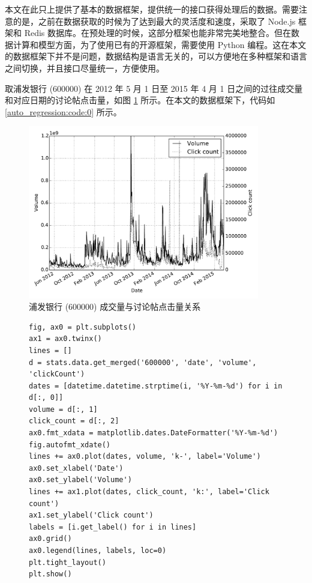 本文在此只上提供了基本的数据框架，提供统一的接口获得处理后的数据。需要注意的是，之前在数据获取的时候为了达到最大的灵活度和速度，采取了 Node.js 框架和 Redis 数据库。在预处理的时候，这部分框架也能非常完美地整合。但在数据计算和模型方面，为了使用已有的开源框架，需要使用 Python 编程。这在本文的数据框架下并不是问题，数据结构是语言无关的，可以方便地在多种框架和语言之间切换，并且接口尽量统一，方便使用。

取浦发银行 (600000) 在 2012 年 5 月 1 日至 2015 年 4 月 1 日之间的过往成交量和对应日期的讨论帖点击量，如图 \ref{auto_regression:0} 所示。在本文的数据框架下，代码如 \ref{auto_regression:code:0} 所示。

\begin{figure}
  \centering
  \includegraphics[width=0.9\textwidth]{plots/auto_regression_0.pdf}
  \caption{浦发银行 (600000) 成交量与讨论帖点击量关系}
  \label{auto_regression:0}
\end{figure}

\begin{figure}
  \begin{minipage}{\textwidth}
    \begin{lstlisting}[caption=数据框架示例, label=auto_regression:code:0]
fig, ax0 = plt.subplots()
ax1 = ax0.twinx()
lines = []
d = stats.data.get_merged('600000', 'date', 'volume', 'clickCount')
dates = [datetime.datetime.strptime(i, '%Y-%m-%d') for i in d[:, 0]]
volume = d[:, 1]
click_count = d[:, 2]
ax0.fmt_xdata = matplotlib.dates.DateFormatter('%Y-%m-%d')
fig.autofmt_xdate()
lines += ax0.plot(dates, volume, 'k-', label='Volume')
ax0.set_xlabel('Date')
ax0.set_ylabel('Volume')
lines += ax1.plot(dates, click_count, 'k:', label='Click count')
ax1.set_ylabel('Click count')
labels = [i.get_label() for i in lines]
ax0.grid()
ax0.legend(lines, labels, loc=0)
plt.tight_layout()
plt.show()
    \end{lstlisting}
  \end{minipage}
\end{figure}

